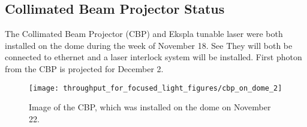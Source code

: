 \subsection{Collimated Beam Projector Status}
\label{sec:cbp}

The Collimated Beam Projector (CBP) and Ekspla tunable laser were both installed on the dome during the week
of November 18. See  They will both be connected to ethernet and a laser interlock system will be installed. First photon from the CBP is projected for December 2.

\iffalse
\begin{figure}[htbp]
  \texttt{[image: throughput\_for\_focused\_light\_figures/cbp\_on\_dome\_1.png]}
  \caption{Image of the CBP, which was installed on the dome on November 22.}
  \label{fig:cbp_1}
\end{figure}
\fi
  
\begin{figure}[htbp]
  \begin{center}
    \texttt{[image: throughput\_for\_focused\_light\_figures/cbp\_on\_dome\_2]}
  \end{center}
  \caption{Image of the CBP, which was installed on the dome on November 22.}
  \label{fig:cbp_2}
\end{figure}

\iffalse
\begin{figure}[htbp]
  \texttt{[image: throughput\_for\_focused\_light\_figures/laser\_on\_dome]}
  \caption{Image of the laser box, containing the Ekspla tunable laser, which was installed on the dome on November 21.}
  \label{fig:laser}
\end{figure}
\fi

